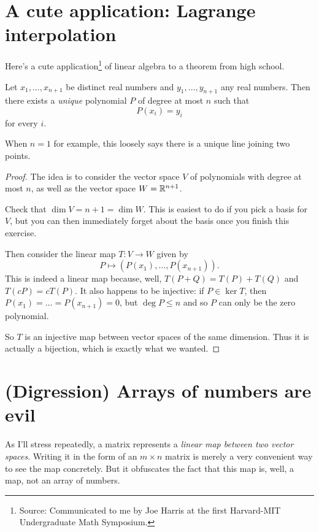 \section{A cute application: Lagrange interpolation}
Here's a cute application\footnote{Source: Communicated to me
by Joe Harris at the first Harvard-MIT Undergraduate Math Symposium.}
of linear algebra to a theorem from high school.
\begin{theorem}
	Let $x_1, \dots, x_{n+1}$ be distinct real numbers
	and $y_1, \dots, y_{n+1}$ any real numbers.
	Then there exists a \emph{unique}
	polynomial $P$ of degree at most $n$
	such that \[ P(x_i) = y_i \] for every $i$.
\end{theorem}
When $n = 1$ for example, this loosely
says there is a unique line joining two points.
\begin{proof}
	The idea is to consider the vector space $V$
	of polynomials with degree at most $n$,
	as well as the vector space $W = \mathbb R^{n+1}$.
	\begin{ques}
		Check that $\dim V = n + 1 = \dim W$.
		This is easiest to do if you pick a basis for $V$,
		but you can then immediately forget about the basis
		once you finish this exercise.
	\end{ques}
	Then consider the linear map $T : V \to W$ given by
	\[ P \mapsto \left( P(x_1), \dots, P(x_{n+1}) \right). \]
	This is indeed a linear map because,
	well, $T(P+Q) = T(P)+T(Q)$ and $T(cP) = cT(P)$.
	It also happens to be injective: if $P \in \ker T$,
	then $P(x_1) = \dots = P(x_{n+1}) = 0$,
	but $\deg P \le n$ and so $P$ can only be the zero polynomial.
	
	So $T$ is an injective map between vector spaces of the same dimension.
	Thus it is actually a bijection, which is exactly what we wanted.
\end{proof}

\section{(Digression) Arrays of numbers are evil}
\label{sec:basis_evil}
As I'll stress repeatedly, a matrix represents a
\emph{linear map between two vector spaces}.
Writing it in the form of an $m \times n$ matrix
is merely a very convenient way to see the map concretely.
But it obfuscates the fact that this map is,
well, a map, not an array of numbers.

